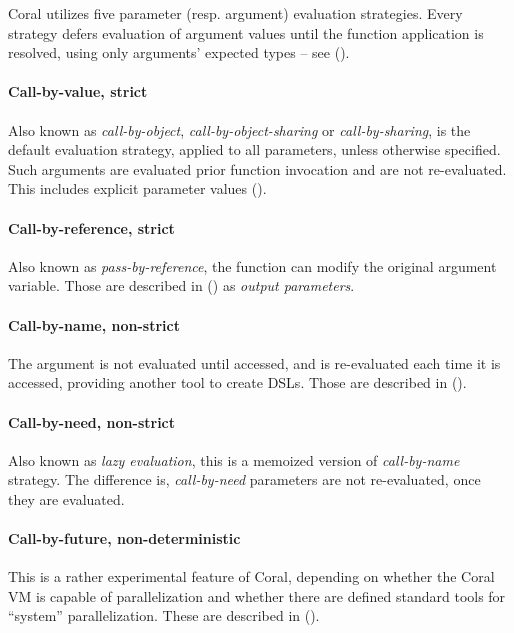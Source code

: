 Coral utilizes five parameter (resp. argument) evaluation strategies. Every strategy defers evaluation of argument values until the function application is resolved, using only arguments' expected types -- see (). 

\paragraph{Call-by-value, strict}
Also known as {\em call-by-object}, {\em call-by-object-sharing} or {\em call-by-sharing}, is the default evaluation strategy, applied to all parameters, unless otherwise specified. Such arguments are evaluated prior function invocation and are not re-evaluated. This includes explicit parameter values ().

\paragraph{Call-by-reference, strict}
Also known as {\em pass-by-reference}, the function can modify the original argument variable. Those are described in () as {\em output parameters}. 

\paragraph{Call-by-name, non-strict}
The argument is not evaluated until accessed, and is re-evaluated each time it is accessed, providing another tool to create DSLs. Those are described in (). 

\paragraph{Call-by-need, non-strict}
Also known as {\em lazy evaluation}, this is a memoized version of {\em call-by-name} strategy. The difference is, {\em call-by-need} parameters are not re-evaluated, once they are evaluated. 

\paragraph{Call-by-future, non-deterministic}
This is a rather experimental feature of Coral, depending on whether the Coral VM is capable of parallelization and whether there are defined standard tools for ``system'' parallelization. These are described in ().






